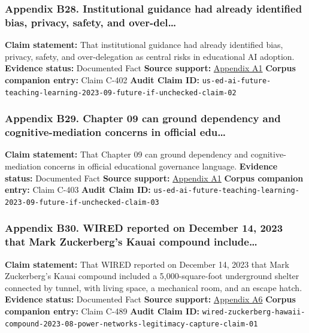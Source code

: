 \documentclass[
  american,
  11pt,
  letterpaper,
]{article}
\begin{document}
\subsubsection{Appendix B28. Institutional guidance had already
identified bias, privacy, safety, and
over-del\ldots{}}\label{ch-09-appendix-b28-institutional-guidance-had-already-identified-bias-privacy-safety-and-over-del}

\textbf{Claim statement:} That institutional guidance had already
identified bias, privacy, safety, and over-delegation as central risks
in educational AI adoption. \textbf{Evidence status:} Documented Fact
\textbf{Source support:}
\hyperref[ch-09-appendix-a1-artificial-intelligence-and-the-future-of-teaching-and-learning-insights-and-recommendations]{Appendix
A1} \textbf{Corpus companion entry:} Claim C-402 \textbf{Audit Claim
ID:}
\texttt{us-ed-ai-future-teaching-learning-2023-09-future-if-unchecked-claim-02}

\subsubsection{Appendix B29. Chapter 09 can ground dependency and
cognitive-mediation concerns in official
edu\ldots{}}\label{ch-09-appendix-b29-chapter-09-can-ground-dependency-and-cognitive-mediation-concerns-in-official-edu}

\textbf{Claim statement:} That Chapter 09 can ground dependency and
cognitive-mediation concerns in official educational governance
language. \textbf{Evidence status:} Documented Fact \textbf{Source
support:}
\hyperref[ch-09-appendix-a1-artificial-intelligence-and-the-future-of-teaching-and-learning-insights-and-recommendations]{Appendix
A1} \textbf{Corpus companion entry:} Claim C-403 \textbf{Audit Claim
ID:}
\texttt{us-ed-ai-future-teaching-learning-2023-09-future-if-unchecked-claim-03}

\subsubsection{Appendix B30. WIRED reported on December 14, 2023 that
Mark Zuckerberg's Kauai compound
include\ldots{}}\label{ch-09-appendix-b30-wired-reported-on-december-14-2023-that-mark-zuckerberg-s-kauai-compound-include}

\textbf{Claim statement:} That WIRED reported on December 14, 2023 that
Mark Zuckerberg's Kauai compound included a 5,000-square-foot
underground shelter connected by tunnel, with living space, a mechanical
room, and an escape hatch. \textbf{Evidence status:} Documented Fact
\textbf{Source support:}
\hyperref[ch-09-appendix-a6-inside-mark-zuckerbergs-top-secret-hawaii-compound]{Appendix
A6} \textbf{Corpus companion entry:} Claim C-489 \textbf{Audit Claim
ID:}
\texttt{wired-zuckerberg-hawaii-compound-2023-08-power-networks-legitimacy-capture-claim-01}
\end{document}
